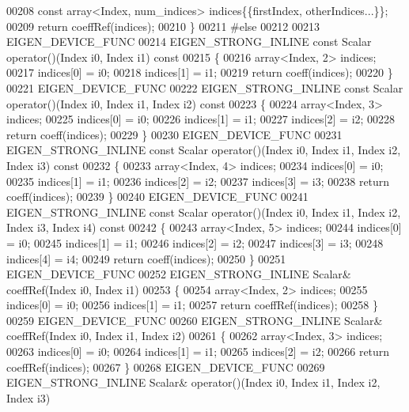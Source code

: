 \begin{DoxyCode}
00208       \textcolor{keyword}{const} array<Index, num\_indices> indices\{\{firstIndex, otherIndices...\}\};
00209       \textcolor{keywordflow}{return} coeffRef(indices);
00210     \}
00211 \textcolor{preprocessor}{#else}
00212 
00213     EIGEN\_DEVICE\_FUNC
00214     EIGEN\_STRONG\_INLINE \textcolor{keyword}{const} Scalar operator()(Index i0, Index i1)\textcolor{keyword}{ const}
00215 \textcolor{keyword}{    }\{
00216       array<Index, 2> indices;
00217       indices[0] = i0;
00218       indices[1] = i1;
00219       \textcolor{keywordflow}{return} coeff(indices);
00220     \}
00221     EIGEN\_DEVICE\_FUNC
00222     EIGEN\_STRONG\_INLINE \textcolor{keyword}{const} Scalar operator()(Index i0, Index i1, Index i2)\textcolor{keyword}{ const}
00223 \textcolor{keyword}{    }\{
00224       array<Index, 3> indices;
00225       indices[0] = i0;
00226       indices[1] = i1;
00227       indices[2] = i2;
00228       \textcolor{keywordflow}{return} coeff(indices);
00229     \}
00230     EIGEN\_DEVICE\_FUNC
00231     EIGEN\_STRONG\_INLINE \textcolor{keyword}{const} Scalar operator()(Index i0, Index i1, Index i2, Index i3)\textcolor{keyword}{ const}
00232 \textcolor{keyword}{    }\{
00233       array<Index, 4> indices;
00234       indices[0] = i0;
00235       indices[1] = i1;
00236       indices[2] = i2;
00237       indices[3] = i3;
00238       \textcolor{keywordflow}{return} coeff(indices);
00239     \}
00240     EIGEN\_DEVICE\_FUNC
00241     EIGEN\_STRONG\_INLINE \textcolor{keyword}{const} Scalar operator()(Index i0, Index i1, Index i2, Index i3, Index i4)\textcolor{keyword}{ const}
00242 \textcolor{keyword}{    }\{
00243       array<Index, 5> indices;
00244       indices[0] = i0;
00245       indices[1] = i1;
00246       indices[2] = i2;
00247       indices[3] = i3;
00248       indices[4] = i4;
00249       \textcolor{keywordflow}{return} coeff(indices);
00250     \}
00251     EIGEN\_DEVICE\_FUNC
00252     EIGEN\_STRONG\_INLINE Scalar& coeffRef(Index i0, Index i1)
00253     \{
00254       array<Index, 2> indices;
00255       indices[0] = i0;
00256       indices[1] = i1;
00257       \textcolor{keywordflow}{return} coeffRef(indices);
00258     \}
00259     EIGEN\_DEVICE\_FUNC
00260     EIGEN\_STRONG\_INLINE Scalar& coeffRef(Index i0, Index i1, Index i2)
00261     \{
00262       array<Index, 3> indices;
00263       indices[0] = i0;
00264       indices[1] = i1;
00265       indices[2] = i2;
00266       \textcolor{keywordflow}{return} coeffRef(indices);
00267     \}
00268     EIGEN\_DEVICE\_FUNC
00269     EIGEN\_STRONG\_INLINE Scalar& operator()(Index i0, Index i1, Index i2, Index i3)

\end{DoxyCode}
